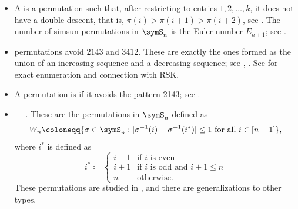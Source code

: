 \begin{itemize}
\item A  is a permutation such that, after restricting
to entries $1,2,\dotsc,k$, it does not have a double descent, that is,
$\pi(i)\gt \pi(i+1) \gt \pi(i+2)$, see \cite{MaYeh2016}.
The number of simsun permutations in $\symS_n$ is the Euler number $E_{n+1}$;
see .

\item {} permutations avoid $2143$ and $3412$. These are
exactly the ones formed as the union of an increasing sequence and a decreasing
sequence; see \cite[Thm.~2.9]{Stankova1994}, .
See \cite{Atkinson1998} for exact enumeration and connection with RSK.

\item \label{vexillary}
A permutation is  if it avoids the pattern 2143; see
.

\item {} --- .
These are the permutations in $\symS_n$ defined as
\[
 W_n \coloneqq
 \{\sigma\in\symS_n:|\sigma^{-1}(i)-\sigma^{-1}(i^*)|\leq 1
 \text{ for all }i\in[n-1]\},
\]
where $i^*$ is defined as
\[
 i^* \coloneqq \begin{cases}
 i-1 &\text{if $i$ is even}  \\
 i+1 &\text{if $i$ is odd and $i+1 \leq n$}  \\
 n & \text{otherwise.}
 \end{cases}
\]
These permutations are studied in \cite{BrentiSentinelli2022x}, and there are generalizations to
other types.

\end{itemize}
